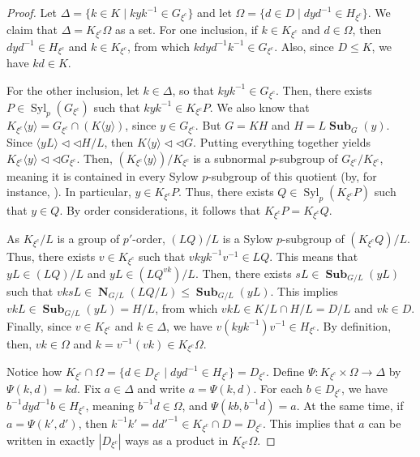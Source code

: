 \documentclass[12pt]{amsart}
\DeclareMathOperator{\NB}{\mathbf{N}}
\DeclareMathOperator{\Syl}{Syl}
\DeclareMathOperator{\Sub}{\mathbf{Sub}}
\theoremstyle{remark}
\theoremstyle{definition}
\theoremstyle{plain}
\theoremstyle{definition}
\numberwithin{equation}{section}
\begin{document}
\begin{proof}
	Let $\Delta = \{k \in K \mid kyk^{-1} \in G_{\xi^c}\}$ and let $\Omega = \{d \in D \mid dyd^{-1} \in H_{\xi^c}\}$. We claim that $\Delta = K_{\xi^c}\Omega$ as a set. For one inclusion, if $k \in K_{\xi^c}$ and $d \in \Omega$, then $dyd^{-1} \in H_{\xi^c}$ and $k \in K_{\xi^c}$, from which $kdyd^{-1}k^{-1} \in G_{\xi^c}$. Also, since $D \leq K$, we have $kd \in K$.
	
	For the other inclusion, let $k \in \Delta$, so that $kyk^{-1} \in G_{\xi^c}$. Then, there exists $P \in \Syl_p(G_{\xi^c})$ such that $kyk^{-1} \in K_{\xi^c}P$. We also know that $K_{\xi^c}\langle y \rangle = G_{\xi^c} \cap (K\langle y \rangle)$, since $y \in G_{\xi^c}$. But $G = KH$ and $H = L \Sub_G(y)$. Since $\langle yL \rangle {\triangleleft}{\triangleleft} H/L$, then $K\langle y \rangle {\triangleleft}{\triangleleft} G$. Putting everything together yields $K_{\xi^c} \langle y \rangle {\triangleleft}{\triangleleft} G_{\xi^c}$. Then, $(K_{\xi^c} \langle y \rangle)/K_{\xi^c}$ is a subnormal $p$-subgroup of $G_{\xi^c}/K_{\xi^c}$, meaning it is contained in every Sylow $p$-subgroup of this quotient (by, for instance, \cite[Problem 2A.1]{FGT}). In particular, $y \in K_{\xi^c}P$. Thus, there exists $Q \in \Syl_p(K_{\xi^c}P)$ such that $y \in Q$. By order considerations, it follows that $K_{\xi^c}P = K_{\xi^c}Q$.
	
	As $K_{\xi^c}/L$ is a group of $p'$-order, $(LQ)/L$ is a Sylow $p$-subgroup of $(K_{\xi^c}Q)/L$. Thus, there exists $v \in K_{\xi^c}$ such that $vkyk^{-1}v^{-1} \in LQ$. This means that $yL \in (LQ)/L$ and $yL \in (LQ^{vk})/L$. Then, there exists $sL \in \Sub_{G/L}(yL)$ such that $vksL \in \NB_{G/L}(LQ/L) \leq \Sub_{G/L}(yL)$. This implies $vkL \in \Sub_{G/L}(yL) = H/L$, from which $vkL \in K/L \cap H/L = D/L$ and $vk \in D$. Finally, since $v \in K_{\xi^c}$ and $k \in \Delta$, we have $v(kyk^{-1})v^{-1} \in H_{\xi^c}$. By definition, then, $vk \in \Omega$ and $k = v^{-1}(vk) \in K_{\xi^c}\Omega$.
	
	Notice how $K_{\xi^c} \cap \Omega = \{d \in D_{\xi^c} \mid dyd^{-1} \in H_{\xi^c}\} = D_{\xi^c}$. Define $\Psi: K_{\xi^c} \times \Omega \to \Delta$ by $\Psi(k, d) = kd$. Fix $a \in \Delta$ and write $a = \Psi(k, d)$. For each $b \in D_{\xi^c}$, we have $b^{-1}dyd^{-1}b \in H_{\xi^c}$, meaning $b^{-1}d \in \Omega$, and $\Psi(kb, b^{-1}d) = a$. At the same time, if $a = \Psi(k', d')$, then $k^{-1}k' = dd'^{-1} \in K_{\xi^c} \cap D = D_{\xi^c}$. This implies that $a$ can be written in exactly $|D_{\xi^c}|$ ways as a product in $K_{\xi^c}\Omega$.
	

\end{proof}
\end{document}
